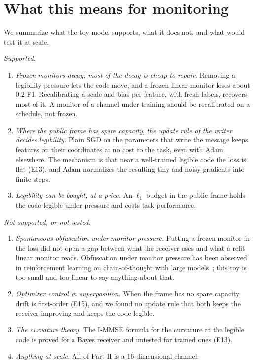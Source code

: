\section{What this means for monitoring}\label{sec:monitoring}

We summarize what the toy model supports, what it does not, and what would test it at scale.

\emph{Supported.}
\begin{enumerate}[leftmargin=*, itemsep=2pt]
\item \emph{Frozen monitors decay; most of the decay is cheap to repair.} Removing a legibility pressure lets the
code move, and a frozen linear monitor loses about $0.2$ F1. Recalibrating a scale and bias per feature, with fresh
labels, recovers most of it. A monitor of a channel under training should be recalibrated on a schedule, not
frozen.
\item \emph{Where the public frame has spare capacity, the update rule of the writer decides legibility.} Plain SGD
on the parameters that write the message keeps features on their coordinates at no cost to the task, even with Adam
elsewhere. The mechanism is that near a well-trained legible code the loss is flat (E13), and Adam normalizes the
resulting tiny and noisy gradients into finite steps.
\item \emph{Legibility can be bought, at a price.} An $\ell_1$ budget in the public frame holds the code legible under
pressure and costs task performance.
\end{enumerate}

\emph{Not supported, or not tested.}
\begin{enumerate}[leftmargin=*, itemsep=2pt]
\item \emph{Spontaneous obfuscation under monitor pressure.} Putting a frozen monitor in the loss did not open a gap
between what the receiver uses and what a refit linear monitor reads. Obfuscation under monitor pressure has been
observed in reinforcement learning on chain-of-thought with large models~\cite{Baker}; this toy is too small and
too linear to say anything about that.
\item \emph{Optimizer control in superposition.} When the frame has no spare capacity, drift is first-order (E15),
and we found no update rule that both keeps the receiver improving and keeps the code legible.
\item \emph{The curvature theory.} The I-MMSE formula for the curvature at the legible code is proved for a Bayes
receiver and untested for trained ones (E13).
\item \emph{Anything at scale.} All of Part II is a 16-dimensional channel.
\end{enumerate}

